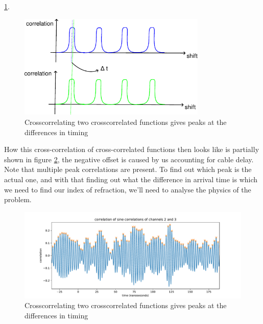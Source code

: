 \ref{fig:IlluCorr}. 
\begin{figure}
  \centering
\includegraphics[width=0.8\textwidth]{figures/IlluCorr.pdf}
\caption{Crosscorrelating two crosscorrelated functions gives peaks at the differences in timing}
	\label{fig:IlluCorr}
\end{figure}
How this cross-correlation of cross-correlated functions then looks like is partially shown
in figure \ref{fig:CrossCrossCorr}, the negative offset is caused by us accounting for cable
delay. Note that multiple peak correlations are present. To find out which peak
is the actual one, and with that finding out what the difference in arrival time is which we
need to find our index of refraction, we'll need to analyse the physics of the problem.
\begin{figure}
  \centering
  \includegraphics[width=\textwidth]{figures/CrossCrossCorr.pdf}
  \caption{Crosscorrelating two crosscorrelated functions gives peaks at the differences in timing}
	\label{fig:CrossCrossCorr}
\end{figure}

